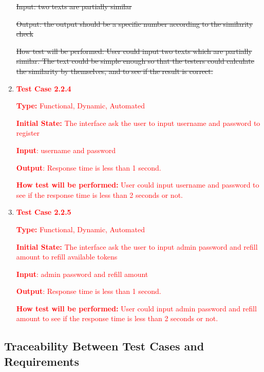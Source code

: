 \documentclass[12pt, titlepage]{article}
\begin{document}
\begin{enumerate}
\st{Input: two texts are partially similar}
					
\st{Output: the output should be a specific number according to the similarity check}
					
\st{How test will be performed: User could input two texts which are partially similar. The text could be simple enough so that the testers could calculate the similarity by themselves, and to see if the result is correct.}

\item{ \textcolor{red}{\textbf{Test Case 2.2.4}}\\}

\textcolor{red}{\textbf{Type:} Functional, Dynamic, Automated}
					
\textcolor{red}{\textbf{Initial State:} The interface ask the user to input username and password to register}
					
\textcolor{red}{\textbf{Input}: username and password}
					
\textcolor{red}{\textbf{Output}: Response time is less than 1 second.}
					
\textcolor{red}{\textbf{How test will be performed:} User could input username and password to see if the response time is less than 2 seconds or not.}

\item{ \textcolor{red}{\textbf{Test Case 2.2.5}}\\}

\textcolor{red}{\textbf{Type:} Functional, Dynamic, Automated}
					
\textcolor{red}{\textbf{Initial State:} The interface ask the user to input admin password and refill amount to refill available tokens}
					
\textcolor{red}{\textbf{Input}: admin password and refill amount}
					
\textcolor{red}{\textbf{Output}: Response time is less than 1 second.}
					
\textcolor{red}{\textbf{How test will be performed:} User could input admin password and refill amount to see if the response time is less than 2 seconds or not.}


\end{enumerate}

\subsection{Traceability Between Test Cases and Requirements}
\end{document}
